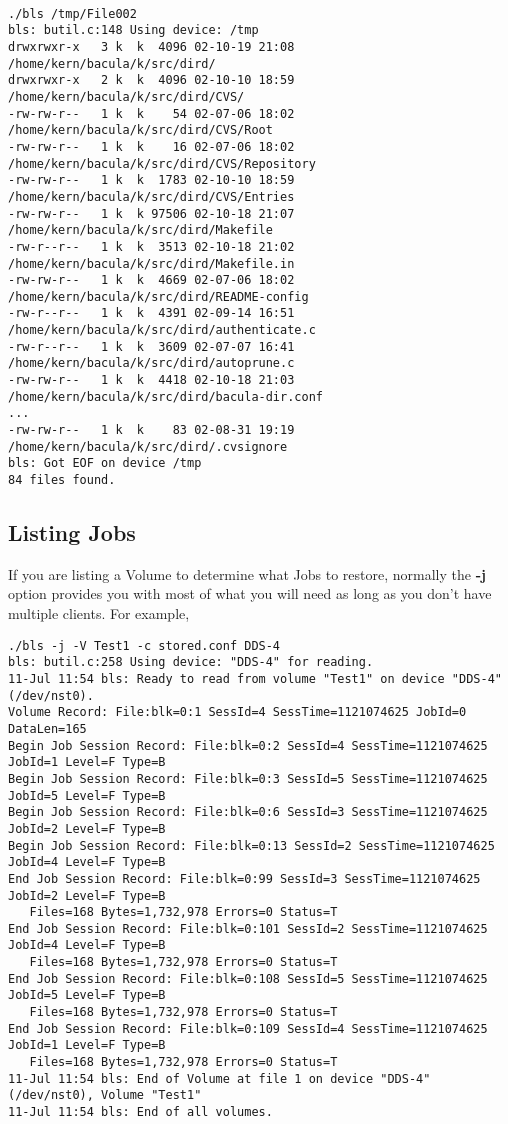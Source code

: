 \footnotesize
\begin{verbatim}
 
./bls /tmp/File002
bls: butil.c:148 Using device: /tmp
drwxrwxr-x   3 k  k  4096 02-10-19 21:08  /home/kern/bacula/k/src/dird/
drwxrwxr-x   2 k  k  4096 02-10-10 18:59  /home/kern/bacula/k/src/dird/CVS/
-rw-rw-r--   1 k  k    54 02-07-06 18:02  /home/kern/bacula/k/src/dird/CVS/Root
-rw-rw-r--   1 k  k    16 02-07-06 18:02  /home/kern/bacula/k/src/dird/CVS/Repository
-rw-rw-r--   1 k  k  1783 02-10-10 18:59  /home/kern/bacula/k/src/dird/CVS/Entries
-rw-rw-r--   1 k  k 97506 02-10-18 21:07  /home/kern/bacula/k/src/dird/Makefile
-rw-r--r--   1 k  k  3513 02-10-18 21:02  /home/kern/bacula/k/src/dird/Makefile.in
-rw-rw-r--   1 k  k  4669 02-07-06 18:02  /home/kern/bacula/k/src/dird/README-config
-rw-r--r--   1 k  k  4391 02-09-14 16:51  /home/kern/bacula/k/src/dird/authenticate.c
-rw-r--r--   1 k  k  3609 02-07-07 16:41  /home/kern/bacula/k/src/dird/autoprune.c
-rw-rw-r--   1 k  k  4418 02-10-18 21:03  /home/kern/bacula/k/src/dird/bacula-dir.conf
...
-rw-rw-r--   1 k  k    83 02-08-31 19:19  /home/kern/bacula/k/src/dird/.cvsignore
bls: Got EOF on device /tmp
84 files found.
\end{verbatim}
\normalsize

\subsection{Listing Jobs}

If you are listing a Volume to determine what Jobs to restore, normally the
{\bf -j} option provides you with most of what you will need as long as you
don't have multiple clients. For example, 

\footnotesize
\begin{verbatim}
./bls -j -V Test1 -c stored.conf DDS-4
bls: butil.c:258 Using device: "DDS-4" for reading.
11-Jul 11:54 bls: Ready to read from volume "Test1" on device "DDS-4" (/dev/nst0).
Volume Record: File:blk=0:1 SessId=4 SessTime=1121074625 JobId=0 DataLen=165
Begin Job Session Record: File:blk=0:2 SessId=4 SessTime=1121074625 JobId=1 Level=F Type=B
Begin Job Session Record: File:blk=0:3 SessId=5 SessTime=1121074625 JobId=5 Level=F Type=B
Begin Job Session Record: File:blk=0:6 SessId=3 SessTime=1121074625 JobId=2 Level=F Type=B
Begin Job Session Record: File:blk=0:13 SessId=2 SessTime=1121074625 JobId=4 Level=F Type=B
End Job Session Record: File:blk=0:99 SessId=3 SessTime=1121074625 JobId=2 Level=F Type=B
   Files=168 Bytes=1,732,978 Errors=0 Status=T
End Job Session Record: File:blk=0:101 SessId=2 SessTime=1121074625 JobId=4 Level=F Type=B
   Files=168 Bytes=1,732,978 Errors=0 Status=T
End Job Session Record: File:blk=0:108 SessId=5 SessTime=1121074625 JobId=5 Level=F Type=B
   Files=168 Bytes=1,732,978 Errors=0 Status=T
End Job Session Record: File:blk=0:109 SessId=4 SessTime=1121074625 JobId=1 Level=F Type=B
   Files=168 Bytes=1,732,978 Errors=0 Status=T
11-Jul 11:54 bls: End of Volume at file 1 on device "DDS-4" (/dev/nst0), Volume "Test1"
11-Jul 11:54 bls: End of all volumes.
\end{verbatim}
\normalsize

